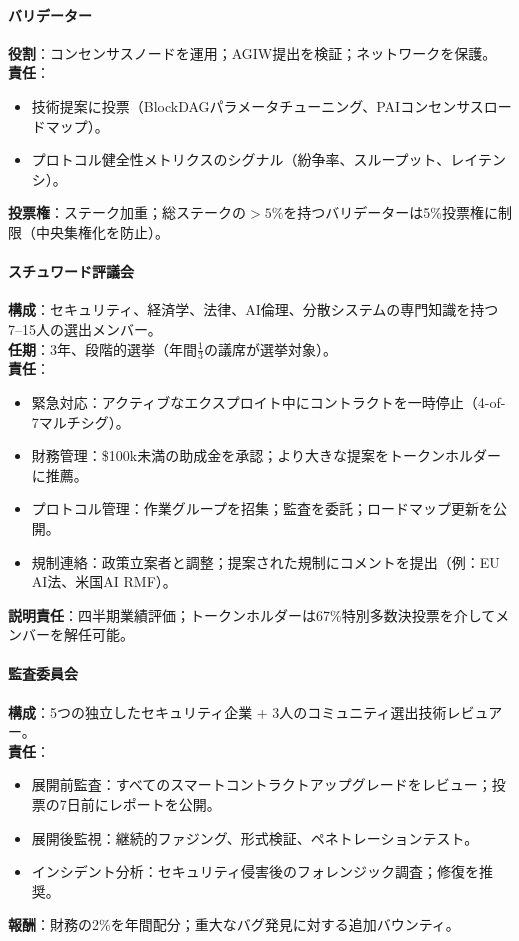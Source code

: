 \documentclass[11pt]{article}
\begin{document}
\paragraph{バリデーター}
\textbf{役割}：コンセンサスノードを運用；AGIW提出を検証；ネットワークを保護。\\
\textbf{責任}：
\begin{itemize}[noitemsep]
  \item 技術提案に投票（BlockDAGパラメータチューニング、PAIコンセンサスロードマップ）。
  \item プロトコル健全性メトリクスのシグナル（紛争率、スループット、レイテンシ）。
\end{itemize}
\textbf{投票権}：ステーク加重；総ステークの$>5\%$を持つバリデーターは5\%投票権に制限（中央集権化を防止）。

\paragraph{スチュワード評議会}
\textbf{構成}：セキュリティ、経済学、法律、AI倫理、分散システムの専門知識を持つ7--15人の選出メンバー。\\
\textbf{任期}：3年、段階的選挙（年間$\frac{1}{3}$の議席が選挙対象）。\\
\textbf{責任}：
\begin{itemize}[noitemsep]
  \item 緊急対応：アクティブなエクスプロイト中にコントラクトを一時停止（4-of-7マルチシグ）。
  \item 財務管理：\$100k未満の助成金を承認；より大きな提案をトークンホルダーに推薦。
  \item プロトコル管理：作業グループを招集；監査を委託；ロードマップ更新を公開。
  \item 規制連絡：政策立案者と調整；提案された規制にコメントを提出（例：EU AI法、米国AI RMF）。
\end{itemize}
\textbf{説明責任}：四半期業績評価；トークンホルダーは67\%特別多数決投票を介してメンバーを解任可能。

\paragraph{監査委員会}
\textbf{構成}：5つの独立したセキュリティ企業 + 3人のコミュニティ選出技術レビュアー。\\
\textbf{責任}：
\begin{itemize}[noitemsep]
  \item 展開前監査：すべてのスマートコントラクトアップグレードをレビュー；投票の7日前にレポートを公開。
  \item 展開後監視：継続的ファジング、形式検証、ペネトレーションテスト。
  \item インシデント分析：セキュリティ侵害後のフォレンジック調査；修復を推奨。
\end{itemize}
\textbf{報酬}：財務の2\%を年間配分；重大なバグ発見に対する追加バウンティ。
\end{document}
